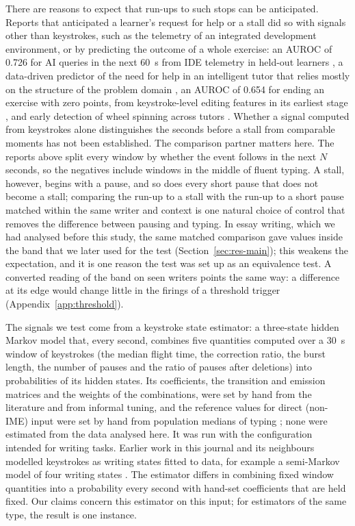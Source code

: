 There are reasons to expect that run-ups to such stops can be anticipated. Reports that anticipated a learner's request
for help or a stall did so with signals other than keystrokes, such as the telemetry of an integrated development
environment, or by predicting the outcome of a whole exercise: an AUROC of 0.726 for AI queries in the next 60~s from
IDE telemetry in held-out learners \cite{barron2026tutortrace}, a data-driven predictor of the need for help in an intelligent
tutor that relies mostly on the structure of the problem domain \cite{maniktala2020helpneed}, an AUROC of 0.654 for
ending an exercise with zero points, from keystroke-level editing features in its earliest stage
\cite{kofune2026struggling}, and early detection of wheel spinning across tutors \cite{zhang2019wheel}. Whether a signal
computed from keystrokes alone distinguishes the seconds before a stall from comparable moments has not been
established. The comparison partner matters here. The reports above split every window by whether the event follows in
the next $N$ seconds, so the negatives include windows in the middle of fluent typing. A stall, however, begins with a
pause, and so does every short pause that does not become a stall; comparing the run-up to a stall with the run-up to a
short pause matched within the same writer and context is one natural choice of control that removes the difference
between pausing and typing. In essay writing, which we had analysed before this study, the same matched comparison gave
values inside the band that we later used for the test (Section~\ref{sec:res-main}); this weakens the expectation,
and it is one reason the test was set up as an equivalence test. A converted reading of the band on seen writers points
the same way: a difference at its edge would change little in the firings of a threshold trigger
(Appendix~\ref{app:threshold}).

The signals we test come from a keystroke state estimator: a three-state hidden Markov model that, every second,
combines five quantities computed over a 30~s window of keystrokes (the median flight time, the correction ratio, the
burst length, the number of pauses and the ratio of pauses after deletions) into probabilities of its hidden states. Its
coefficients, the transition and emission matrices and the weights of the combinations, were set by hand from the
literature and from informal tuning, and the reference values for direct (non-IME) input were set by hand from
population medians of typing \cite{dhakal2018typing}; none were estimated from the data analysed here. It was run with
the configuration intended for writing tasks. Earlier work in this journal and its neighbours modelled keystrokes as
writing states fitted to data, for example a semi-Markov model of four writing states
\cite{guo2020scenario,guo2018basic}. The estimator differs in combining fixed window quantities into a probability every
second with hand-set coefficients that are held fixed. Our claims concern this estimator on this input; for estimators
of the same type, the result is one instance.

